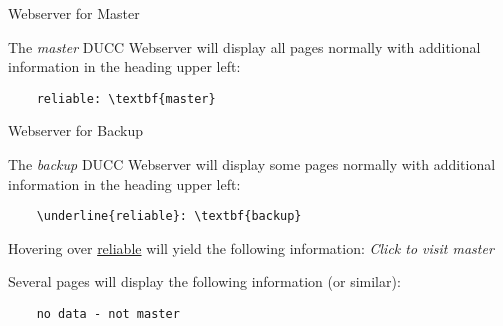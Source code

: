 	Webserver for Master

	The {\em master} DUCC Webserver will display all pages normally with additional
	information in the heading upper left:
	
	\begin{verbatim}
	reliable: \textbf{master}
   	\end{verbatim}
	
	Webserver for Backup
	
	The {\em backup} DUCC Webserver will display some pages normally with additional
	information in the heading upper left:
	
	\begin{verbatim}
	\underline{reliable}: \textbf{backup}
   	\end{verbatim}
   	
   	Hovering over \underline{reliable} will yield the following information:
   	{\em Click to visit master}
   	
   	Several pages will display the following information (or similar):
   	
   	\begin{verbatim}
	no data - not master
   	\end{verbatim}
	